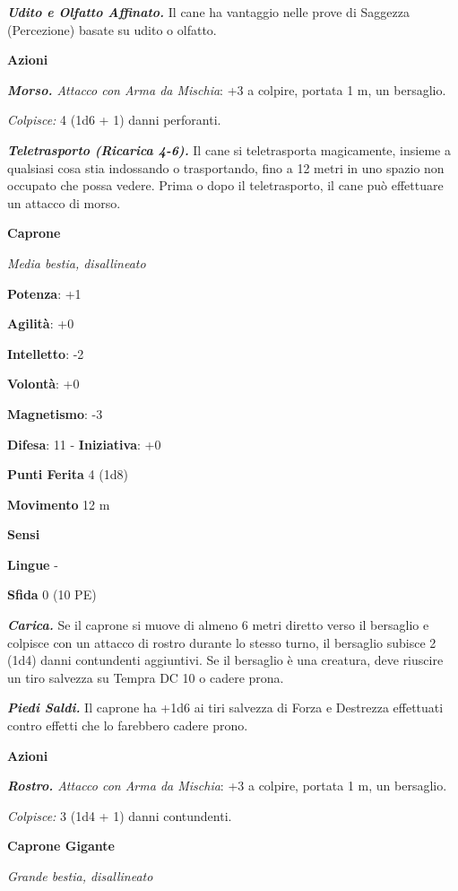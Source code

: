 \begin{multicols}{2}
\emph{\textbf{Udito e Olfatto Affinato.}} Il cane ha vantaggio nelle
prove di Saggezza (Percezione) basate su udito o olfatto.

\smallskip\textbf{Azioni}

\emph{\textbf{Morso.} Attacco con Arma da Mischia}: +3 a colpire,
portata 1 m, un bersaglio.

\emph{Colpisce:} 4 (1d6 + 1) danni perforanti.

\emph{\textbf{Teletrasporto (Ricarica 4-6).}} Il cane si teletrasporta
magicamente, insieme a qualsiasi cosa stia indossando o trasportando,
fino a 12 metri in uno spazio non occupato che possa vedere. Prima o
dopo il teletrasporto, il cane può effettuare un attacco di morso.

\textbf{Caprone}

\emph{Media bestia, disallineato}

\textbf{Potenza}: +1

\textbf{Agilità}: +0

\textbf{Intelletto}: -2

\textbf{Volontà}: +0

\textbf{Magnetismo}: -3

\textbf{Difesa}: 11 - \textbf{Iniziativa}: +0

\textbf{Punti Ferita} 4 (1d8)

\textbf{Movimento} 12 m

\textbf{Sensi} 

\textbf{Lingue} -

\textbf{Sfida} 0 (10 PE)\smallskip

\emph{\textbf{Carica.}} Se il caprone si muove di almeno 6 metri diretto
verso il bersaglio e colpisce con un attacco di rostro durante lo stesso
turno, il bersaglio subisce 2 (1d4) danni contundenti aggiuntivi. Se il
bersaglio è una creatura, deve riuscire un tiro salvezza su Tempra DC 10
o cadere prona.

\emph{\textbf{Piedi Saldi.}} Il caprone ha +1d6 ai tiri salvezza di
Forza e Destrezza effettuati contro effetti che lo farebbero cadere
prono.

\smallskip\textbf{Azioni}

\emph{\textbf{Rostro.} Attacco con Arma da Mischia}: +3 a colpire,
portata 1 m, un bersaglio.

\emph{Colpisce:} 3 (1d4 + 1) danni contundenti.

\textbf{Caprone Gigante}

\emph{Grande bestia, disallineato}


\end{multicols}
